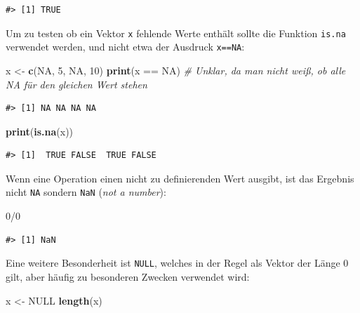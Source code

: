 \documentclass[]{tufte-book}
\newenvironment{Shaded}{}{}
\newcommand{\KeywordTok}[1]{\textcolor[rgb]{0.00,0.44,0.13}{\textbf{#1}}}
\newcommand{\DecValTok}[1]{\textcolor[rgb]{0.25,0.63,0.44}{#1}}
\newcommand{\StringTok}[1]{\textcolor[rgb]{0.25,0.44,0.63}{#1}}
\newcommand{\CommentTok}[1]{\textcolor[rgb]{0.38,0.63,0.69}{\textit{#1}}}
\newcommand{\OtherTok}[1]{\textcolor[rgb]{0.00,0.44,0.13}{#1}}
\newcommand{\OperatorTok}[1]{\textcolor[rgb]{0.40,0.40,0.40}{#1}}
\newcommand{\NormalTok}[1]{#1}
\begin{document}
\begin{verbatim}
#> [1] TRUE
\end{verbatim}

Um zu testen ob ein Vektor \texttt{x} fehlende Werte enthält sollte die
Funktion \texttt{is.na} verwendet werden, und nicht etwa der Ausdruck
\texttt{x==NA}:

\begin{Shaded}
\begin{Highlighting}[]
\NormalTok{x <-}\StringTok{ }\KeywordTok{c}\NormalTok{(}\OtherTok{NA}\NormalTok{, }\DecValTok{5}\NormalTok{, }\OtherTok{NA}\NormalTok{, }\DecValTok{10}\NormalTok{)}
\KeywordTok{print}\NormalTok{(x }\OperatorTok{==}\StringTok{ }\OtherTok{NA}\NormalTok{)  }\CommentTok{# Unklar, da man nicht weiß, ob alle NA für den gleichen Wert stehen}
\end{Highlighting}
\end{Shaded}

\begin{verbatim}
#> [1] NA NA NA NA
\end{verbatim}

\begin{Shaded}
\begin{Highlighting}[]
\KeywordTok{print}\NormalTok{(}\KeywordTok{is.na}\NormalTok{(x))}
\end{Highlighting}
\end{Shaded}

\begin{verbatim}
#> [1]  TRUE FALSE  TRUE FALSE
\end{verbatim}

Wenn eine Operation einen nicht zu definierenden Wert ausgibt, ist das
Ergebnis nicht \texttt{NA} sondern \texttt{NaN} (\emph{not a number}):

\begin{Shaded}
\begin{Highlighting}[]
\DecValTok{0}\OperatorTok{/}\DecValTok{0}
\end{Highlighting}
\end{Shaded}

\begin{verbatim}
#> [1] NaN
\end{verbatim}

Eine weitere Besonderheit ist \texttt{NULL}, welches in der Regel als
Vektor der Länge 0 gilt, aber häufig zu besonderen Zwecken verwendet
wird:

\begin{Shaded}
\begin{Highlighting}[]
\NormalTok{x <-}\StringTok{ }\OtherTok{NULL}
\KeywordTok{length}\NormalTok{(x)}
\end{Highlighting}
\end{Shaded}
\end{document}
